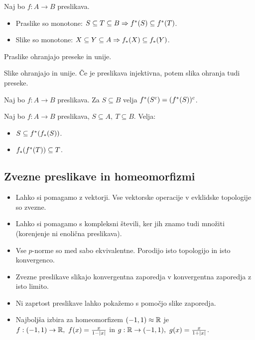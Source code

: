 \begin{trditev}
    Naj bo $f: A \to B$ preslikava.
    \begin{itemize}
        \item Praslike so monotone: $S \subseteq T \subseteq B \Rightarrow f^{*}(S) \subseteq f^{*}(T)$.
        \item Slike so monotone: $X \subseteq Y \subseteq A \Rightarrow f_{*}(X) \subseteq f_{*}(Y)$.
    \end{itemize}
\end{trditev}

\begin{trditev}
    Praslike ohranjajo preseke in unije.
\end{trditev}

\begin{trditev}
    Slike ohranjajo in unije. Če je preslikava injektivna, potem slika ohranja tudi preseke.
\end{trditev}

\begin{trditev}
    Naj bo $f: A \to B$ preslikava. Za $S \subseteq B$ velja $f^{*}(S^c) = (f^{*}(S))^c$.
\end{trditev}

\begin{trditev}
    Naj bo $f: A \to B$ preslikava, $S \subseteq A, \ T \subseteq B$. Velja:
    \begin{itemize}
        \item $S \subseteq f^{*}(f_{*}(S))$.
        \item $f_{*}(f^{*}(T)) \subseteq T$.
    \end{itemize}
\end{trditev}

\subsection{Zvezne preslikave in homeomorfizmi}
\begin{itemize}
    \item Lahko si pomagamo z vektorji. Vse vektorske operacije v evklidske topologije so zvezne.
    \item Lahko si pomagamo s kompleksni števili, ker jih znamo tudi množiti (korenjenje ni enolična preslikava).
    \item Vse $p$-norme so med sabo ekvivalentne. Porodijo isto topologijo in isto konvergenco.
    \item Zvezne preslikave slikajo konvergentna zaporedja v konvergentna zaporedja z isto limito.
    \item Ni zaprtost preslikave lahko pokažemo s pomočjo slike zaporedja.
    \item Najboljša izbira za homeomorfizem $(-1, 1) \approx \mathbb{R}$ je $f: (-1, 1) \to \R, \ f(x) = \frac{x}{1 - |x|}$ in $g: \mathbb{R} \to (-1, 1), \ g(x) = \frac{x}{1+|x|}$.
\end{itemize}

